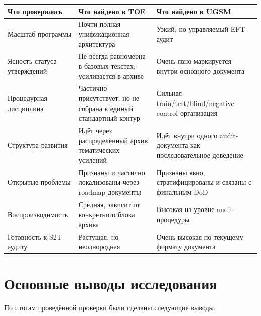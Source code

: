 \documentclass[12pt,a4paper]{article}
\begin{document}
\begin{longtable}{p{5.2cm}p{4.1cm}p{4.1cm}}
\toprule
Что проверялось & Что найдено в TOE & Что найдено в UGSM \\
\midrule
\endhead
Масштаб программы & Почти полная унификационная архитектура & Узкий, но управляемый EFT-аудит \\

Ясность статуса утверждений & Не всегда равномерна в базовых текстах; усиливается в архиве & Очень явно маркируется внутри основного документа \\

Процедурная дисциплина & Частично присутствует, но не собрана в единый стандартный контур & Сильная train/test/blind/negative-control организация \\

Структура развития & Идёт через распределённый архив тематических усилений & Идёт внутри одного audit-документа как последовательное доведение \\

Открытые проблемы & Признаны и частично локализованы через roadmap-документы & Признаны явно, стратифицированы и связаны с финальным DoD \\

Воспроизводимость & Средняя, зависит от конкретного блока архива & Высокая на уровне audit-процедуры \\

Готовность к S2T-аудиту & Растущая, но неоднородная & Очень высокая по текущему формату документа \\
\bottomrule
\end{longtable}

\section{Основные выводы исследования}

По итогам проведённой проверки были сделаны следующие выводы.
\end{document}
